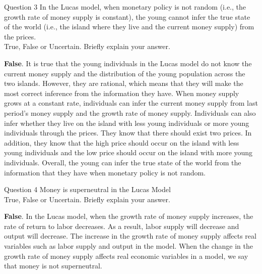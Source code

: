 \documentclass[a4paper]{article}
\newif\IfInSansMode
\numberwithin{equation}{section}
\numberwithin{figure}{section}
\begin{document}
	\begin{questionbox}{Question 3}
		In the Lucas model, when monetary policy is not random (i.e., the growth rate of money supply is constant), the young cannot infer the true state of the world (i.e., the island where they live and the current money supply) from the prices.\\
		True, False or Uncertain. Briefly explain your answer.
		\begin{explanationbox}
			\textbf{False}. It is true that the young individuals in the Lucas model do not know the current money supply and the distribution of the young population across the two islands. However, they are rational, which means that they will make the most correct inference from the information they have. When money supply grows at a constant rate, individuals can infer the current money supply from last period's money supply and the growth rate of money supply. Individuals can also infer whether they live on the island with less young individuals or more young individuals through the prices. They know that there should exist two prices. In addition, they know that the high price should occur on the island with less young individuals and the low price should occur on the island with more young individuals. Overall, the young can infer the true state of the world from the information that they have when monetary policy is not random.
		\end{explanationbox}
	\end{questionbox}
	\begin{questionbox}{Question 4}
		Money is superneutral in the Lucas Model\\
		True, False or Uncertain. Briefly explain your answer.
		\begin{explanationbox}
			\textbf{False}. In the Lucas model, when the growth rate of money supply increases, the rate of return to labor decreases. As a result, labor supply will decrease and output will decrease. The increase in the growth rate of money supply affects real variables such as labor supply and output in the model. When the change in the growth rate of money supply affects real economic variables in a model, we say that money is not superneutral.
		\end{explanationbox}
	\end{questionbox}
\end{document}
